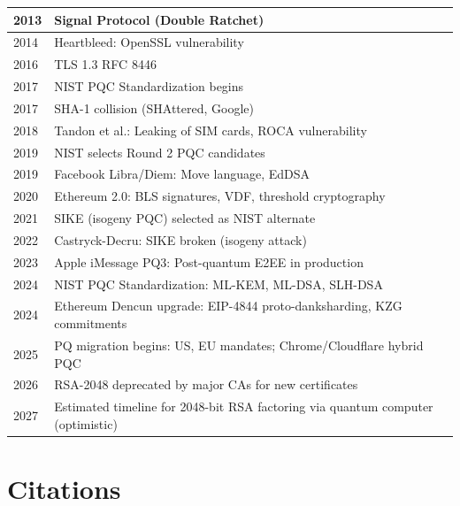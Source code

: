 \begin{tabularx}{\linewidth}{|l|X|}
2013 & Signal Protocol (Double Ratchet) \\ \hline
2014 & Heartbleed: OpenSSL vulnerability \\ \hline
2016 & TLS 1.3 RFC 8446 \\ \hline
2017 & NIST PQC Standardization begins \\ \hline
2017 & SHA-1 collision (SHAttered, Google) \\ \hline
2018 & Tandon et al.: Leaking of SIM cards, ROCA vulnerability \\ \hline
2019 & NIST selects Round 2 PQC candidates \\ \hline
2019 & Facebook Libra/Diem: Move language, EdDSA \\ \hline
2020 & Ethereum 2.0: BLS signatures, VDF, threshold cryptography \\ \hline
2021 & SIKE (isogeny PQC) selected as NIST alternate \\ \hline
2022 & Castryck-Decru: SIKE broken (isogeny attack) \\ \hline
2023 & Apple iMessage PQ3: Post-quantum E2EE in production \\ \hline
2024 & NIST PQC Standardization: ML-KEM, ML-DSA, SLH-DSA \\ \hline
2024 & Ethereum Dencun upgrade: EIP-4844 proto-danksharding, KZG commitments \\ \hline
2025 & PQ migration begins: US, EU mandates; Chrome/Cloudflare hybrid PQC \\ \hline
2026 & RSA-2048 deprecated by major CAs for new certificates \\ \hline
2027 & Estimated timeline for 2048-bit RSA factoring via quantum computer (optimistic) \\ \hline
\end{tabularx}

\section{Citations}
\label{sec:crypto:citations}

